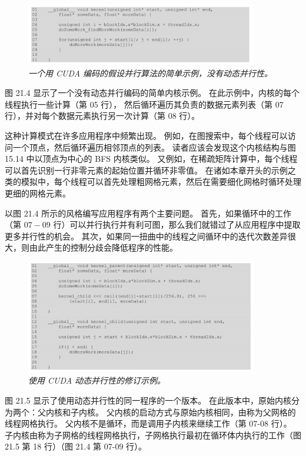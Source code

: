 \begin{figure}[H]
	\centering
	\includegraphics[width=0.9\textwidth]{figs/F21.4.png}
	\caption{\textit{一个用 CUDA 编码的假设并行算法的简单示例，没有动态并行性。}}
\end{figure}

图 21.4 显示了一个没有动态并行编码的简单内核示例。 在此示例中，内核的每个线程执行一些计算（第 05 行），
然后循环遍历其负责的数据元素列表（第 07 行），并对每个数据元素执行另一次计算（第 08 行）。

这种计算模式在许多应用程序中频繁出现。 例如，在图搜索中，每个线程可以访问一个顶点，然后循环遍历相邻顶点的列表。 
读者应该会发现这个内核结构与图 15.14 中以顶点为中心的 BFS 内核类似。 
又例如，在稀疏矩阵计算中，每个线程可以首先识别一行非零元素的起始位置并循环非零值。 
在诸如本章开头的示例之类的模拟中，每个线程可以首先处理粗网格元素，然后在需要细化网格时循环处理更细的网格元素。

以图 21.4 所示的风格编写应用程序有两个主要问题。 
首先，如果循环中的工作（第 $07-09$ 行）可以并行执行并有利可图，那么我们就错过了从应用程序中提取更多并行性的机会。 
其次，如果同一扭曲中的线程之间循环中的迭代次数差异很大，则由此产生的控制分歧会降低程序的性能。

\begin{figure}[H]
	\centering
	\includegraphics[width=0.9\textwidth]{figs/F21.5.png}
	\caption{\textit{使用 CUDA 动态并行性的修订示例。}}
\end{figure}

图 21.5 显示了使用动态并行性的同一程序的一个版本。 在此版本中，原始内核分为两个：父内核和子内核。 
父内核的启动方式与原始内核相同，由称为父网格的线程网格执行。 父内核不是循环，而是调用子内核来继续工作（第 07-08 行）。 
子内核由称为子网格的线程网格执行，子网格执行最初在循环体内执行的工作（图 21.5 第 18 行）（图 21.4 第 07-09 行）。

